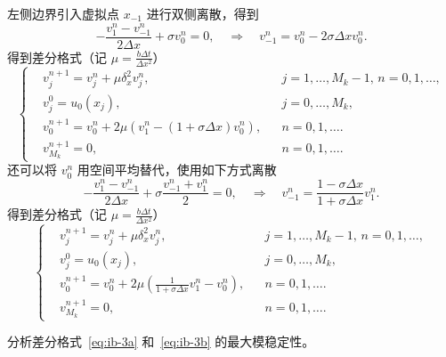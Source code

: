 左侧边界引入虚拟点 $x_{-1}$ 进行双侧离散，得到
\[
    - \frac{v_{1}^{n}-v_{-1}^{n}}{2\Delta x} + \sigma v_0^n = 0, \quad \Rightarrow \quad v_{-1}^{n} = v_0^{n} - 2\sigma \Delta x v_0^n.
\]
得到差分格式（记 $\mu = \frac{b \Delta t}{\Delta x^2}$）
\begin{equation}
    \left\{
    \begin{aligned}
         & v_j^{n+1} = v_j^n + \mu \delta_x^2 v_j^n,                    &  & j=1,\dots,M_k-1,\, n=0,1,\dots, \\
         & v_j^0 = u_0(x_j),                                            &  & j=0,\dots,M_k,                  \\
         & v_0^{n+1} = v_0^n + 2\mu (v_1^n-(1+ \sigma \Delta x) v_0^n), &  & n=0,1,\dots.                    \\
         & v_{M_k}^{n+1} = 0,                                           &  & n=0,1,\dots.
    \end{aligned}
    \right.
    \label{eq:ib-3a}
\end{equation}
还可以将 $v_0^n$ 用空间平均替代，使用如下方式离散
\[
    - \frac{v_{1}^{n}-v_{-1}^{n}}{2\Delta x} + \sigma \frac{v_{-1}^n + v_1^n}2 = 0, \quad \Rightarrow \quad v_{-1}^{n} = \frac{1-\sigma \Delta x}{1+\sigma \Delta x} v_1^n.
\]
得到差分格式（记 $\mu = \frac{b \Delta t}{\Delta x^2}$）
\begin{equation}
    \left\{
    \begin{aligned}
         & v_j^{n+1} = v_j^n + \mu \delta_x^2 v_j^n,                                      &  & j=1,\dots,M_k-1,\, n=0,1,\dots, \\
         & v_j^0 = u_0(x_j),                                                              &  & j=0,\dots,M_k,                  \\
         & v_0^{n+1} = v_0^n + 2\mu \left(\frac{1}{1+\sigma \Delta x}v_1^n- v_0^n\right), &  & n=0,1,\dots.                    \\
         & v_{M_k}^{n+1} = 0,                                                             &  & n=0,1,\dots.
    \end{aligned}
    \right.    \label{eq:ib-3b}
\end{equation}


\begin{example}
    分析差分格式~\eqref{eq:ib-3a} 和~\eqref{eq:ib-3b} 的最大模稳定性。
\end{example}

